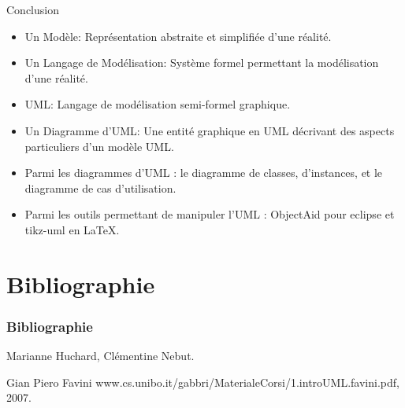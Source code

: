 \documentclass{beamer}
\begin{document}
  \begin{frame}{Conclusion}
    \begin{itemize}
      \item {\alert{Un Modèle}: Représentation abstraite et simplifiée d'une réalité.}
      \item {\alert{Un Langage de Modélisation}: Système formel permettant la modélisation d'une réalité.}
      \item {\alert{UML}: Langage de modélisation semi-formel graphique.}
      \item {\alert{Un Diagramme d'UML}: Une entité graphique en UML décrivant des aspects particuliers d'un modèle UML.}
      \item {Parmi les diagrammes d'UML : \alert{le diagramme de classes}, \alert{d'instances}, et le \alert{diagramme de cas d'utilisation}.}
      \item {Parmi les outils permettant de manipuler l'UML : \alert{ObjectAid} pour eclipse et \alert{tikz-uml} en LaTeX.}
    \end{itemize}
  \end{frame}

\section*{Bibliographie}

  \begin{frame}[allowframebreaks]

    \frametitle<presentation>{Bibliographie}
    \begin{thebibliography}{}
      Marianne Huchard, Clémentine Nebut.

      Gian Piero Favini
      www.cs.unibo.it/gabbri/MaterialeCorsi/1.introUML.favini.pdf, 2007.
    \end{thebibliography}

  \end{frame}
\end{document}

